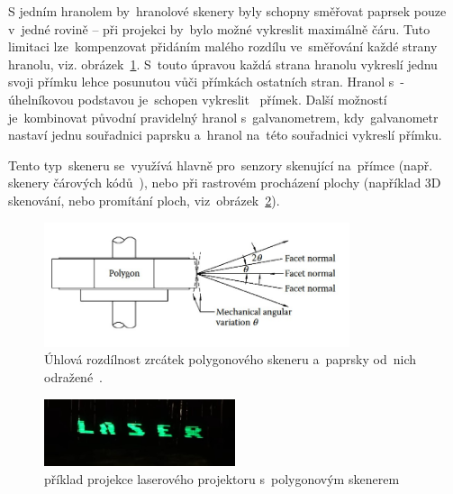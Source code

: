 
%

S jedním hranolem by~hranolové skenery byly schopny směřovat paprsek pouze v~jedné rovině -- při projekci by~bylo možné vykreslit maximálně čáru. Tuto limitaci  lze~kompenzovat přidáním malého rozdílu ve~směřování každé strany hranolu, viz. obrázek~\ref{fig:polygon-angular-variation}. S~touto úpravou každá strana hranolu vykreslí jednu svoji přímku lehce posunutou vůči přímkách ostatních stran. Hranol s~-úhelníkovou podstavou je~schopen vykreslit ~přímek.
Další možností je~kombinovat původní pravidelný hranol s~galvanometrem,  kdy~galvanometr nastaví jednu souřadnici paprsku a~hranol na~této souřadnici vykreslí přímku.

Tento  typ~skeneru se~využívá hlavně  pro~senzory skenující na~přímce (např. skenery čárových kódů~\cite{history-of-barcode-scanning}), nebo při rastrovém procházení plochy (například 3D skenování, nebo promítání ploch,  viz~obrázek~\ref{fig:harddrive-projection}).

\begin{figure}[H]
  \centering
  \includegraphics[width=0.8\textwidth]{img/polygon-angular-variation.jpg}
  \caption{\label{fig:polygon-angular-variation} Úhlová rozdílnost zrcátek polygonového skeneru a~paprsky od~nich odražené~\cite{scanning-handbook}.}
\end{figure}


\begin{figure}[H]
  \centering
  \includegraphics[width=0.5\textwidth]{img/harddrive-projection.jpg}
  \caption{\label{fig:harddrive-projection} příklad projekce laserového projektoru s~polygonovým skenerem~\cite{harddrive-projector-youtube}}
\end{figure}

